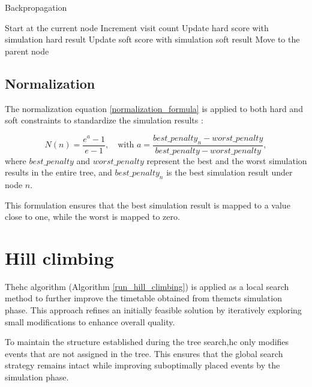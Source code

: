 \begin{algorithm}
\caption{Backpropagation}\label{backpropagation}
\begin{algorithmic}[1]
    \State Start at the current node
        \State Increment visit count
        \State Update hard score with simulation hard result
        \State Update soft score with simulation soft result
        \State Move to the parent node
    \EndWhile
\EndProcedure
\end{algorithmic}
\end{algorithm}

\subsection{Normalization}\label{sec:normalization}

The normalization equation \ref{normalization_formula} is applied to both hard and soft constraints to standardize the simulation results \cite{pedroso_tree_2015}:

\begin{equation}
N(n) = \frac{e^a - 1}{e - 1}, \quad \text{with } a = \frac{best\_penalty_n - worst\_penalty}{best\_penalty - worst\_penalty},\label{normalization_formula}
\end{equation}
where \(best\_penalty\) and \(worst\_penalty\) represent the best and the worst simulation results in the entire tree, and \(best\_penalty_n\) is the best simulation result under node \(n\).

This formulation ensures that the best simulation result is mapped to a value close to one, while the worst is mapped to zero.

\section{Hill climbing}\label{hill_climbing_section}

The\ac{hc} algorithm (Algorithm \ref{run_hill_climbing}) is applied as a local search method to further improve the timetable obtained from the\ac{mcts} simulation phase. This approach refines an initially feasible solution by iteratively exploring small modifications to enhance overall quality.

To maintain the structure established during the tree search,\ac{hc} only modifies events that are not assigned in the tree. This ensures that the global search strategy remains intact while improving suboptimally placed events by the simulation phase.

